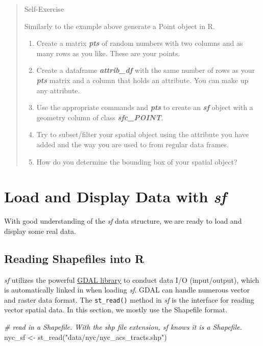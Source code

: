 \documentclass[
  11pt,
]{book}
\newenvironment{Shaded}{\begin{snugshade}}{\end{snugshade}}
\newcommand{\CommentTok}[1]{\textcolor[rgb]{0.56,0.35,0.01}{\textit{#1}}}
\newcommand{\FunctionTok}[1]{\textcolor[rgb]{0.00,0.00,0.00}{#1}}
\newcommand{\NormalTok}[1]{#1}
\newcommand{\OtherTok}[1]{\textcolor[rgb]{0.56,0.35,0.01}{#1}}
\newcommand{\StringTok}[1]{\textcolor[rgb]{0.31,0.60,0.02}{#1}}
\providecommand{\tightlist}{%
  \setlength{\itemsep}{0pt}\setlength{\parskip}{0pt}}
\begin{document}
\begin{quote}
Self-Exercise

Similarly to the example above generate a Point object in R.

\begin{enumerate}
\def\labelenumi{\arabic{enumi}.}
\tightlist
\item
  Create a matrix \textbf{\emph{pts}} of random numbers with two columns and as many rows as you like. These are your points.
\item
  Create a dataframe \textbf{\emph{attrib\_df}} with the same number of rows as your \textbf{\emph{pts}} matrix and a column that holds an attribute. You can make up any attribute.
\item
  Use the appropriate commands and \textbf{\emph{pts}} to create an \textbf{\emph{sf}} object with a geometry column of class \textbf{\emph{sfc\_POINT}}.
\item
  Try to subset/filter your spatial object using the attribute you have added and the way you are used to from regular data frames.
\item
  How do you determine the bounding box of your spatial object?
\end{enumerate}
\end{quote}

\hypertarget{load-and-display-data-with-sf}{%
\section{\texorpdfstring{Load and Display Data with \emph{sf}}{Load and Display Data with sf}}\label{load-and-display-data-with-sf}}

With good understanding of the \emph{sf} data structure, we are ready to load and display some real data.

\hypertarget{reading-shapefiles-into-r}{%
\subsection{Reading Shapefiles into R}\label{reading-shapefiles-into-r}}

\emph{sf} utilizes the powerful \href{http://gdal.org}{GDAL library} to conduct data I/O (input/output), which is automatically linked in when loading \emph{sf}. GDAL can handle numerous vector and raster data format. The \texttt{st\_read()} method in \emph{sf} is the interface for reading vector spatial data. In this section, we mostly use the Shapefile format.

\begin{Shaded}
\begin{Highlighting}[]
\CommentTok{\# read in a Shapefile. With the \textquotesingle{}shp\textquotesingle{} file extension, sf knows it is a Shapefile.}
\NormalTok{nyc\_sf }\OtherTok{\textless{}{-}} \FunctionTok{st\_read}\NormalTok{(}\StringTok{"data/nyc/nyc\_acs\_tracts.shp"}\NormalTok{)}
\end{Highlighting}
\end{Shaded}
\end{document}
